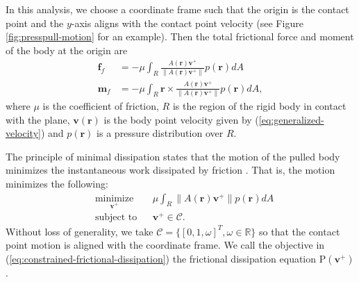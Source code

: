 \documentclass[conference]{IEEEtran}
\DeclareMathOperator{\sign}{\text{sgn}}
\begin{document}
In this analysis, we choose a coordinate frame such that the origin is
the contact point and the $y$-axis aligns with the contact point
velocity (see Figure \ref{fig:presspull-motion} for an example). Then
the total frictional force and moment of the body at the origin are
\begin{align}
  \mathbf{f}_f &= -\mu\int_{R}\frac{A(\mathbf{r})\mathbf{v}^+}{\lVert A(\mathbf{r})\mathbf{v}^+ \rVert} p(\mathbf{r}) dA \\
  \mathbf{m}_f &= -\mu\int_{R}\mathbf{r}\times\frac{A(\mathbf{r})\mathbf{v}^+}{\lVert A(\mathbf{r})\mathbf{v}^+ \rVert} p(\mathbf{r}) dA, \label{eq:moment-at-contact}
\end{align}
where $\mu$ is the coefficient of friction, $R$ is the region of the
rigid body in contact with the plane, $\mathbf{v}(\mathbf{r})$ is the
body point velocity given by (\ref{eq:generalized-velocity}) and
$p(\mathbf{r})$ is a pressure distribution over $R$.

The principle of minimal dissipation states that the motion of the
pulled body minimizes the instantaneous work dissipated by friction
\cite{alexander1993bounds}. That is, the motion minimizes the
following: 
\begin{equation}
\begin{aligned}
& \underset{\mathbf{v}^+}{\text{minimize}}
& & \mu\int_R\lVert A(\mathbf{r})\mathbf{v}^+ \rVert p(\mathbf{r}) dA \\
& \text{subject to}
& & \mathbf{v}^+ \in \mathcal{C}.
\end{aligned} \label{eq:constrained-frictional-dissipation}
\end{equation}
Without loss of generality, we take
$\mathcal{C} = \{[0,1,\omega]^T, \omega \in \mathbb{R}\}$ so that the
contact point motion is aligned with the coordinate frame. We call the
objective in (\ref{eq:constrained-frictional-dissipation}) the
frictional dissipation equation $\mathrm{P}(\mathbf{v}^+)$.
\end{document}

